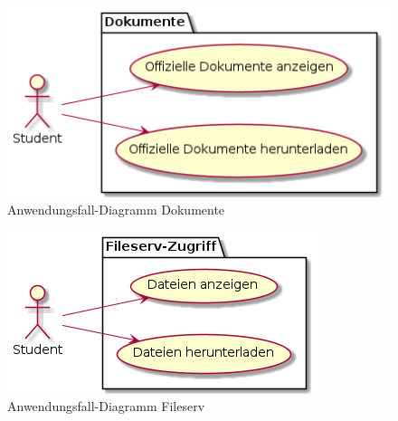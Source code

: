\documentclass[12pt, a4paper]{scrartcl}
\begin{document}
\begin{figure}[h]
	\centering
	\includegraphics[width=.6\textwidth]{usecase_do.png}
	\caption{Anwendungsfall-Diagramm Dokumente}
\end{figure}

\begin{figure}[h]
	\centering
	\includegraphics[width=.6\textwidth]{usecase_fs.png}
	\caption{Anwendungsfall-Diagramm Fileserv}
\end{figure}
\end{document}
